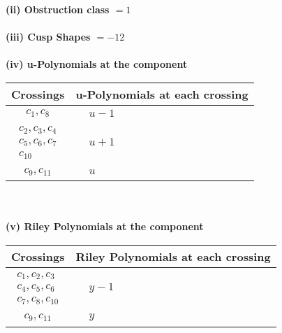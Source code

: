 \documentclass[1p]{elsarticle_modified}
\theoremstyle{definition}
\begin{document}
\flushleft \textbf{(ii) Obstruction class $= 1$}\\~\\
\flushleft \textbf{(iii) Cusp Shapes $= -12$}\\~\\
\newpage\renewcommand{\arraystretch}{1}
\flushleft \textbf{(iv) u-Polynomials at the component}\newline \\
\begin{tabular}{m{50pt}|m{274pt}}
Crossings & \hspace{64pt}u-Polynomials at each crossing \\
\hline $$\begin{aligned}c_{1},c_{8}\end{aligned}$$&$\begin{aligned}
&u-1
\end{aligned}$\\
\hline $$\begin{aligned}c_{2},c_{3},c_{4}\\c_{5},c_{6},c_{7}\\c_{10}\end{aligned}$$&$\begin{aligned}
&u+1
\end{aligned}$\\
\hline $$\begin{aligned}c_{9},c_{11}\end{aligned}$$&$\begin{aligned}
&u
\end{aligned}$\\
\hline
\end{tabular}\\~\\
\newpage\renewcommand{\arraystretch}{1}
\flushleft \textbf{(v) Riley Polynomials at the component}\newline \\
\begin{tabular}{m{50pt}|m{274pt}}
Crossings & \hspace{64pt}Riley Polynomials at each crossing \\
\hline $$\begin{aligned}c_{1},c_{2},c_{3}\\c_{4},c_{5},c_{6}\\c_{7},c_{8},c_{10}\end{aligned}$$&$\begin{aligned}
&y-1
\end{aligned}$\\
\hline $$\begin{aligned}c_{9},c_{11}\end{aligned}$$&$\begin{aligned}
&y
\end{aligned}$\\
\hline
\end{tabular}\\~\\
\end{document}
